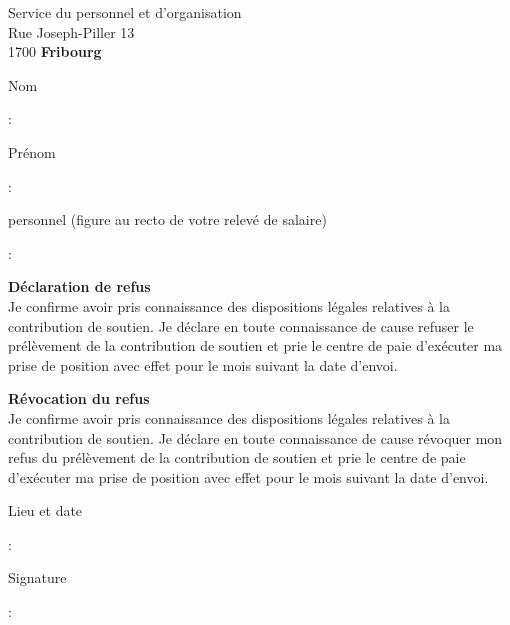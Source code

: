 \documentclass{ltr} %
\begin{document}
\begin{letter}{\adret Service du personnel et d'organisation\\ Rue Joseph-Piller 13\\[1ex] 1700 \textbf{Fribourg}}
\conc{}
\opening{}

	\vspace{3ex}\par\noindent\parbox{5cm}{Nom}: \dotfill
	\vspace{3ex}\par\noindent\parbox{5cm}{Prénom}: \dotfill
	\vspace{3ex}\par\noindent\parbox[t]{5cm}{\No personnel (figure au recto de votre relevé de salaire)}: \dotfill

	\vspace{2ex}\par{}

	\vspace{2ex}\par{\bfseries\raisebox{.5mm}{\fbox{\rule{0mm}{1ex}\rule{1ex}{0mm}} } Déclaration de refus}\\
	Je confirme avoir pris connaissance des dispositions légales relatives à la contribution de soutien.
	Je déclare en toute connaissance de cause refuser le prélèvement de la contribution de soutien et
	prie le centre de paie d'exécuter ma prise de position avec effet pour le mois suivant la date
	d'envoi.

	\vspace{3ex}\par{\bfseries\raisebox{.5mm}{\fbox{\rule{0mm}{1ex}\rule{1ex}{0mm}} } Révocation du refus}\\
	Je confirme avoir pris connaissance des dispositions légales relatives à la contribution de
	soutien. Je déclare en toute connaissance de cause révoquer mon refus du prélèvement de la
	contribution de soutien et prie le centre de paie d'exécuter ma prise de position avec effet pour
	le mois suivant la date d'envoi.

	\vspace{4ex}\par\noindent\parbox{3cm}{Lieu et date}: \dotfill
	\vspace{4ex}\par\noindent\parbox{3cm}{Signature}: \dotfill

\end{letter}
\end{document}
